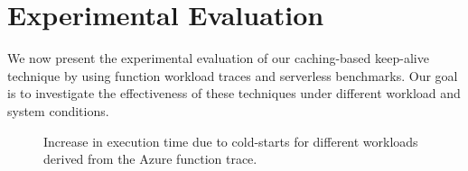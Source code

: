 \section{Experimental Evaluation}

\label{sec:eval}


We now present the experimental evaluation of our caching-based keep-alive technique by using function workload traces and serverless benchmarks.
Our goal is to investigate the effectiveness of these techniques under different workload and system conditions. 


\begin{figure}
  \centering
{}
  \hfill 
\hfill 
\caption{Increase in execution time due to cold-starts for different workloads derived from the Azure function trace.}
\label{fig:exec-overheads-all}
\end{figure}


